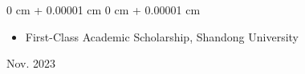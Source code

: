 \documentclass[10pt, letterpaper]{article}
\newenvironment{highlights}{
    \begin{itemize}[
        topsep=0.10 cm,
        parsep=0.10 cm,
        partopsep=0pt,
        itemsep=0pt,
        leftmargin=0 cm + 10pt
    ]
}{
    \end{itemize}
} %
\newenvironment{onecolentry}{
    \begin{adjustwidth}{
        0 cm + 0.00001 cm
    }{
        0 cm + 0.00001 cm
    }
}{
    \end{adjustwidth}
} %
\newenvironment{twocolentry}[2][]{
    \onecolentry
    \def\secondColumn{#2}
    \setcolumnwidth{\fill, 4.5 cm}
    \begin{paracol}{2}
}{
    \switchcolumn \raggedleft \secondColumn
    \end{paracol}
    \endonecolentry
} %
\begin{document}
\vspace{0.10 cm}

\begin{twocolentry}{Nov. 2023}
\begin{highlights}
\item First-Class Academic Scholarship, Shandong University
\end{highlights}
\end{twocolentry}






    





\end{document}
